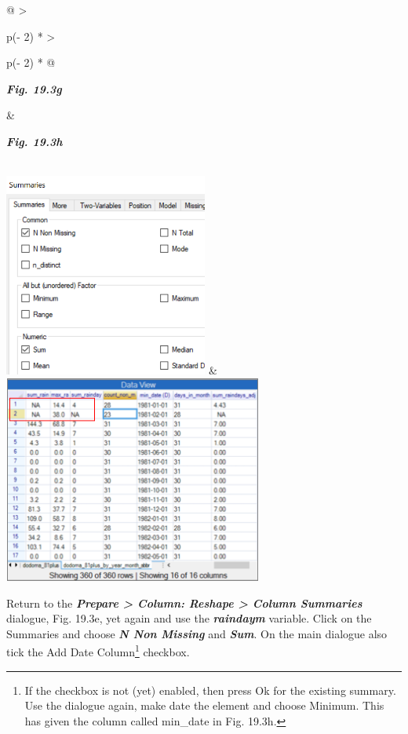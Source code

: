 \documentclass[
  letterpaper,
  DIV=11,
  numbers=noendperiod]{scrreprt}
\begin{document}
\begin{longtable}[]{@{}
  >{\raggedright\arraybackslash}p{(\columnwidth - 2\tabcolsep) * }
  >{\raggedright\arraybackslash}p{(\columnwidth - 2\tabcolsep) * }@{}}
\toprule\noalign{}
\begin{minipage}[b]{\linewidth}\raggedright
\textbf{\emph{Fig. 19.3g}}
\end{minipage} & \begin{minipage}[b]{\linewidth}\raggedright
\textbf{\emph{Fig. 19.3h}}
\end{minipage} \\
\midrule\noalign{}
\endhead
\bottomrule\noalign{}
\endlastfoot
\includegraphics[width=2.63872in,height=2.63325in]{figures/Fig19.3g.png}
&
\includegraphics[width=3.35593in,height=2.69319in]{figures/Fig19.3h.png} \\
\end{longtable}

Return to the \textbf{\emph{Prepare \textgreater{} Column: Reshape
\textgreater{} Column Summaries}} dialogue, Fig. 19.3e, yet again and
use the \textbf{\emph{raindaym}} variable. Click on the Summaries and
choose \textbf{\emph{N Non Missing}} and \textbf{\emph{Sum}}. On the
main dialogue also tick the Add Date Column\footnote{If the checkbox is
  not (yet) enabled, then press Ok for the existing summary. Use the
  dialogue again, make date the element and choose Minimum. This has
  given the column called min\_date in Fig. 19.3h.} checkbox.
\end{document}
